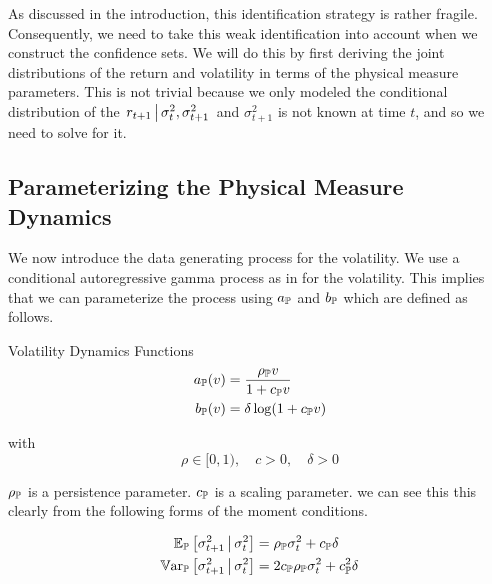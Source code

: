 \documentclass[11pt, letterpaper, twoside, final]{article}
\begin{document}
As discussed in the introduction, this identification strategy is rather fragile.
Consequently, we need to take this weak identification into account when we construct the confidence sets.
We will do this by first deriving the joint distributions of the return and volatility in terms of the physical
measure parameters.
This is not trivial because we only modeled the conditional distribution of the $\left. r_{t+1} \,\middle\vert\, \sigma^2_{t},
\sigma^2_{t+1} \right.$  and $\sigma^2_{t+1}$ is not known at time $t$, and so we need to solve for it.


\subsection{Parameterizing the Physical Measure Dynamics}

We now introduce the data generating process for the volatility.
We use a conditional autoregressive gamma process as in \textcite{gourieroux2006autoregressive, khrapov2016affine}
for the volatility.
This implies that we can parameterize the process using $a_{\mathbb{P}}$ and $b_{\mathbb{P}}$ which are defined as follows.

\begin{defn}{Volatility Dynamics Functions}
    \label{defn:physical_vol_dynamics}
    \begin{align}
        \label{defn:a_PP}
        a_{\mathbb{P}}(v) &= \frac{\rho_{\mathbb{P}} v}{1 + c_{\mathbb{P}} v} \\
        \label{defn:b_PP}
        b_{\mathbb{P}}(v) &= \delta \log(1 + c_{\mathbb{P}} v)
    \end{align}
    
    with 
    \begin{equation}
        \rho \in [0,1), \quad c > 0, \quad \delta > 0
    \end{equation}

\end{defn}

$\rho_{\mathbb{P}}$ is a persistence parameter.
$c_{\mathbb{P}}$ is a scaling parameter.
we can see this this clearly from the following forms of the moment conditions.

\begin{remark} 
    \label{remark:vol_moment_conditions}
    \begin{align}
        \E_{\PP}\left[\sigma^2_{t+1} \mvert \sigma^2_t \right]  &= \rho_{\PP} \sigma^2_t  + c_{\PP} \delta\\
%
        \Var_{\PP}\left[\sigma^2_{t+1} \mvert \sigma^2_t \right]  &=  2 c_{\PP} \rho_{\PP} \sigma^2_t  + c_{\PP}^2
        \delta \\
%
    \end{align}
\end{remark}
\end{document}
